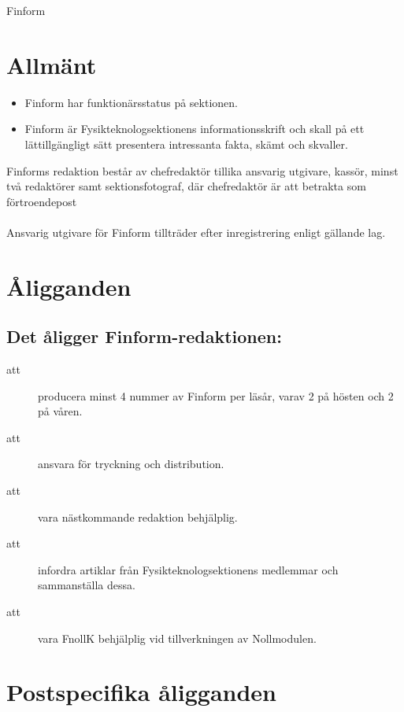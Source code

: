 \documentclass[a4paper]{article}
\begin{document}
\renewcommand{\forening}{Finform} %

\begin{foreningenv}{\forening{}} %
    \section{Allmänt}
    \begin{itemize}
        \item Finform har funktionärsstatus på sektionen.
        \item Finform är Fysikteknologsektionens informationsskrift och skall på ett lättillgängligt sätt presentera intressanta fakta, skämt och skvaller.
    \end{itemize}
    
    Finforms redaktion består av chefredaktör tillika ansvarig utgivare, kassör, minst två redaktörer samt sektionsfotograf, där chefredaktör är att betrakta som förtroendepost \\ \\
    Ansvarig utgivare för Finform tillträder efter inregistrering enligt gällande lag.\\
    
    \section{Åligganden}
    \aliggsektfunkt{}
        
    \subsection{Det åligger Finform-redaktionen:}
    \begin{description}
        \item[att] producera minst 4 nummer av Finform per läsår, varav 2 på hösten och 2 på våren.
        \item[att] ansvara för tryckning och distribution.
        \item[att] vara nästkommande redaktion behjälplig.
        \item[att] infordra artiklar från Fysikteknologsektionens medlemmar och sammanställa dessa.
        \item[att] vara FnollK behjälplig vid tillverkningen av Nollmodulen.
    \end{description}
    
    \section{Postspecifika åligganden}

\end{foreningenv}
\end{document}
